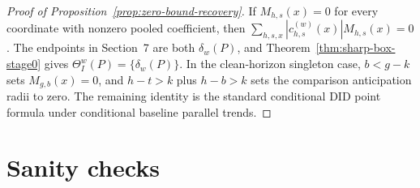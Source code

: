 \documentclass[11pt]{article}
\theoremstyle{definition}
\theoremstyle{plain}
\theoremstyle{remark}
\begin{document}
\begin{proof}[Proof of Proposition~\ref{prop:zero-bound-recovery}]
If \(M_{h,s}(x)=0\) for every coordinate with nonzero pooled coefficient, then
\(\sum_{h,s,x}|c^{(w)}_{h,s}(x)|M_{h,s}(x)=0\).  The endpoints in Section~7 are
both \(\delta_w(P)\), and Theorem~\ref{thm:sharp-box-stage0} gives
\(\Theta_I^w(P)=\{\delta_w(P)\}\).  In the clean-horizon singleton case,
\(b<g-k\) sets \(M_{g,b}(x)=0\), and \(h-t>k\) plus \(h-b>k\) sets the comparison
anticipation radii to zero.  The remaining identity is the standard conditional
DID point formula under conditional baseline parallel trends.
\end{proof}

\section{Sanity checks}
\end{document}
